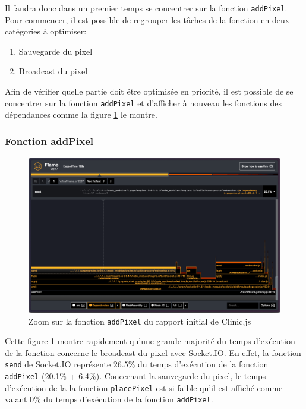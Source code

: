 Il faudra donc dans un premier temps se concentrer sur la fonction \texttt{addPixel}. Pour commencer, il est possible de regrouper les tâches de la fonction en deux catégories à optimiser:

\begin{enumerate}
  \item Sauvegarde du pixel
  \item Broadcast du pixel
\end{enumerate}

Afin de vérifier quelle partie doit être optimisée en priorité, il est possible de se concentrer sur la fonction \texttt{addPixel} et d'afficher à nouveau les fonctions des dépendances comme la figure \ref{fig:flame1-addPixel} le montre.

\subsubsection{Fonction addPixel}

\begin{figure}[H]
  \centering
  \includegraphics[width=1\textwidth]{./assets/figures/flame/flame1-addPixel.png}
  \caption{Zoom sur la fonction \texttt{addPixel} du rapport initial de Clinic.js}
  \label{fig:flame1-addPixel}
\end{figure}

Cette figure \ref{fig:flame1-addPixel} montre rapidement qu'une grande majorité du temps d'exécution de la fonction concerne le broadcast du pixel avec Socket.IO. En effet, la fonction \texttt{send} de Socket.IO représente 26.5\% du temps d'exécution de la fonction \texttt{addPixel} (20.1\% + 6.4\%). Concernant la sauvegarde du pixel, le temps d'exécution de la la fonction \texttt{placePixel} est si faible qu'il est affiché comme valant 0\% du temps d'exécution de la fonction \texttt{addPixel}.

